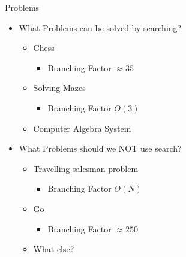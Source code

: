 \documentclass[presentation]{beamer}
\begin{document}
\begin{frame}{Problems}
  \begin{itemize}
  \item What Problems can be solved by searching?
    \begin{itemize}
    \item <1-> Chess
      \begin{itemize}
      \item <7-> Branching Factor $\approx 35$
      \end{itemize}
    \item <2-> Solving Mazes
      \begin{itemize}
      \item <8-> Branching Factor $O(3)$
      \end{itemize}
    \item <3-> Computer Algebra System
    \end{itemize}
  \item What Problems should we NOT use search?
    \begin{itemize}
    \item <4-> Travelling salesman problem
      \begin{itemize}
      \item <9-> Branching Factor $O(N)$
      \end{itemize}
    \item <5-> Go
      \begin{itemize}
      \item <10-> Branching Factor $\approx 250$
      \end{itemize}
    \item <6-> What else?
    \end{itemize}
  \end{itemize}
\end{frame}
\end{document}
